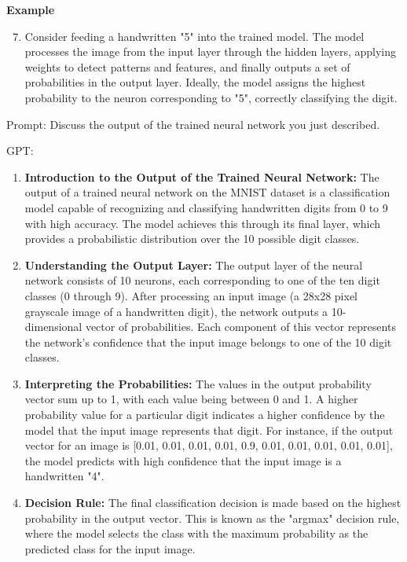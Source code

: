 \textbf{Example}

\begin{enumerate}
    \setcounter{enumi}{6}
    \item Consider feeding a handwritten "5" into the trained model. The model processes the image from the input layer through the hidden layers, applying weights to detect patterns and features, and finally outputs a set of probabilities in the output layer. Ideally, the model assigns the highest probability to the neuron corresponding to "5", correctly classifying the digit.
\end{enumerate}


Prompt: Discuss the output of the trained neural network you just described.

GPT:

\begin{enumerate}
    \item \textbf{Introduction to the Output of the Trained Neural Network:}
    The output of a trained neural network on the MNIST dataset is a classification model capable of recognizing and classifying handwritten digits from 0 to 9 with high accuracy. The model achieves this through its final layer, which provides a probabilistic distribution over the 10 possible digit classes.

    \item \textbf{Understanding the Output Layer:}
    The output layer of the neural network consists of 10 neurons, each corresponding to one of the ten digit classes (0 through 9). After processing an input image (a 28x28 pixel grayscale image of a handwritten digit), the network outputs a 10-dimensional vector of probabilities. Each component of this vector represents the network's confidence that the input image belongs to one of the 10 digit classes.

    \item \textbf{Interpreting the Probabilities:}
    The values in the output probability vector sum up to 1, with each value being between 0 and 1. A higher probability value for a particular digit indicates a higher confidence by the model that the input image represents that digit. For instance, if the output vector for an image is [0.01, 0.01, 0.01, 0.01, 0.9, 0.01, 0.01, 0.01, 0.01, 0.01], the model predicts with high confidence that the input image is a handwritten "4".

    \item \textbf{Decision Rule:}
    The final classification decision is made based on the highest probability in the output vector. This is known as the "argmax" decision rule, where the model selects the class with the maximum probability as the predicted class for the input image.


\end{enumerate}
